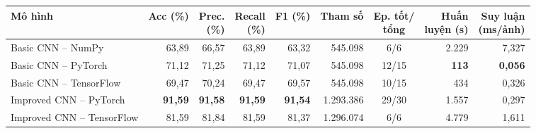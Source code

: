 \begin{tabular}{lrrrrrcrr}
\toprule
Mô hình & Acc (\%) & \makecell[r]{Prec.\\(\%)} & \makecell[r]{Recall\\(\%)} & F1 (\%) & Tham số & \makecell[c]{Ep. tốt/\\tổng} & \makecell[r]{Huấn\\luyện (s)} & \makecell[r]{Suy luận\\(ms/ảnh)} \\
\midrule
Basic CNN – NumPy & 63{,}89 & 66{,}57 & 63{,}89 & 63{,}32 & 545{.}098 & 6/6 & 2{.}229 & 7{,}327 \\
Basic CNN – PyTorch & 71{,}12 & 71{,}25 & 71{,}12 & 71{,}07 & 545{.}098 & 12/15 & \textbf{113} & \textbf{0{,}056} \\
Basic CNN – TensorFlow & 69{,}47 & 70{,}24 & 69{,}47 & 69{,}57 & 545{.}098 & 10/15 & 434 & 0{,}326 \\
Improved CNN – PyTorch & \textbf{91{,}59} & \textbf{91{,}58} & \textbf{91{,}59} & \textbf{91{,}54} & 1{.}293{.}386 & 29/30 & 1{.}557 & 0{,}297 \\
Improved CNN – TensorFlow & 81{,}59 & 81{,}84 & 81{,}59 & 81{,}37 & 1{.}296{.}074 & 6/6 & 4{.}779 & 1{,}611 \\
\bottomrule
\end{tabular}
